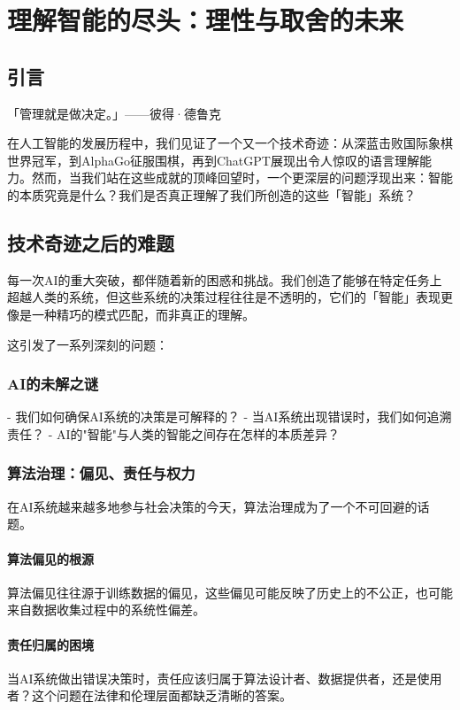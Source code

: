 \chapter{理解智能的尽头：理性与取舍的未来}

\section{引言}

「管理就是做决定。」——彼得·德鲁克

在人工智能的发展历程中，我们见证了一个又一个技术奇迹：从深蓝击败国际象棋世界冠军，到AlphaGo征服围棋，再到ChatGPT展现出令人惊叹的语言理解能力。然而，当我们站在这些成就的顶峰回望时，一个更深层的问题浮现出来：智能的本质究竟是什么？我们是否真正理解了我们所创造的这些「智能」系统？

\section{技术奇迹之后的难题}

每一次AI的重大突破，都伴随着新的困惑和挑战。我们创造了能够在特定任务上超越人类的系统，但这些系统的决策过程往往是不透明的，它们的「智能」表现更像是一种精巧的模式匹配，而非真正的理解。

这引发了一系列深刻的问题：

\subsection{AI的未解之谜}
- 我们如何确保AI系统的决策是可解释的？
- 当AI系统出现错误时，我们如何追溯责任？
- AI的"智能"与人类的智能之间存在怎样的本质差异？

\subsection{算法治理：偏见、责任与权力}

在AI系统越来越多地参与社会决策的今天，算法治理成为了一个不可回避的话题。

\subsubsection{算法偏见的根源}
算法偏见往往源于训练数据的偏见，这些偏见可能反映了历史上的不公正，也可能来自数据收集过程中的系统性偏差。

\subsubsection{责任归属的困境}
当AI系统做出错误决策时，责任应该归属于算法设计者、数据提供者，还是使用者？这个问题在法律和伦理层面都缺乏清晰的答案。

